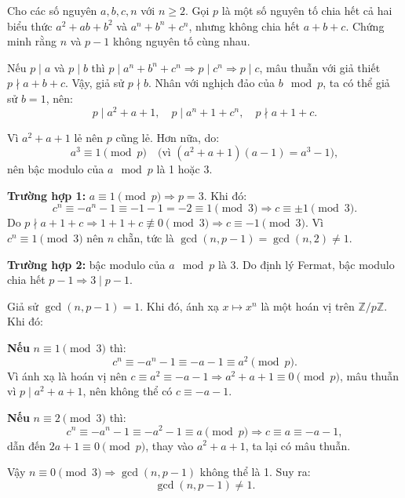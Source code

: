 \ifshowproblem
\begin{problem}\label{problem:FRA-2015-TST1-P7}
    Cho các số nguyên $a, b, c, n$ với $n \geq 2$.
    Gọi $p$ là một số nguyên tố chia hết cả hai biểu thức $a^2 + ab + b^2$ và $a^n + b^n + c^n$, nhưng không chia hết $a + b + c$.  
    Chứng minh rằng $n$ và $p - 1$ không nguyên tố cùng nhau.
\end{problem}
\fi

\ifshowsoln
\begin{soln}\footnotemark
    Nếu \( p \mid a \) và \( p \mid b \) thì \( p \mid a^n + b^n + c^n \Rightarrow p \mid c^n \Rightarrow p \mid c \),
    mâu thuẫn với giả thiết \( p \nmid a + b + c \). Vậy, giả sử \( p \nmid b \). Nhân với nghịch đảo của \( b \mod p \), ta có thể giả sử \( b = 1 \), nên:
    \[
        p \mid a^2 + a + 1, \quad p \mid a^n + 1 + c^n, \quad p \nmid a + 1 + c.
    \]

    Vì \( a^2 + a + 1 \) lẻ nên \( p \) cũng lẻ. Hơn nữa, do:
    \[
        a^3 \equiv 1 \pmod{p} \quad \text{(vì } (a^2 + a + 1)(a - 1) = a^3 - 1),
    \]
    nên bậc modulo của \( a \mod p \) là 1 hoặc 3.

    \textbf{Trường hợp 1:} \( a \equiv 1 \pmod{p} \Rightarrow p = 3 \). Khi đó:
    \[
        c^n \equiv -a^n - 1 \equiv -1 - 1 = -2 \equiv 1 \pmod{3} \Rightarrow c \equiv \pm 1 \pmod{3}.
    \]
    Do \( p \nmid a + 1 + c \Rightarrow 1 + 1 + c \not\equiv 0 \pmod{3} \Rightarrow c \equiv -1 \pmod{3} \).
    Vì \( c^n \equiv 1 \pmod{3} \) nên \( n \) chẵn, tức là \( \gcd(n, p - 1) = \gcd(n, 2) \ne 1 \).

    \textbf{Trường hợp 2:} bậc modulo của \( a \mod p \) là 3. Do định lý Fermat, bậc modulo chia hết \( p - 1 \Rightarrow 3 \mid p - 1 \).

    Giả sử \( \gcd(n, p - 1) = 1 \). Khi đó, ánh xạ \( x \mapsto x^n \) là một hoán vị trên \( \mathbb{Z}/p\mathbb{Z} \). Khi đó:

    \textbf{Nếu } \( n \equiv 1 \pmod{3} \) thì:
    \[
        c^n \equiv -a^n - 1 \equiv -a - 1 \equiv a^2 \pmod{p}.
    \]
    Vì ánh xạ là hoán vị nên \( c \equiv a^2 \equiv -a - 1 \Rightarrow a^2 + a + 1 \equiv 0 \pmod{p} \),
    mâu thuẫn vì \( p \mid a^2 + a + 1 \), nên không thể có \( c \equiv -a - 1 \).

    \textbf{Nếu } \( n \equiv 2 \pmod{3} \) thì:
    \[
        c^n \equiv -a^n - 1 \equiv -a^2 - 1 \equiv a \pmod{p} \Rightarrow c \equiv a \equiv -a - 1,
    \]
    dẫn đến \( 2a + 1 \equiv 0 \pmod{p} \), thay vào \( a^2 + a + 1 \), ta lại có mâu thuẫn.

    Vậy \( n \equiv 0 \pmod{3} \Rightarrow \gcd(n, p - 1) \) không thể là 1. Suy ra:
    \[
        \gcd(n, p - 1) \ne 1.
    \]
\end{soln}
\fi

